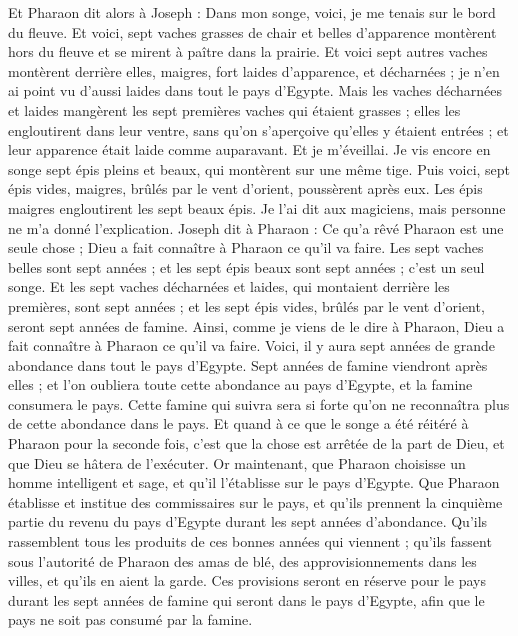 \begin{multicols}{2}
Et Pharaon dit alors à Joseph : Dans mon songe, voici, je me tenais sur le bord du fleuve.
Et voici, sept vaches grasses de chair et belles d'apparence montèrent hors du fleuve et se mirent à paître dans la prairie.
Et voici sept autres vaches montèrent derrière elles, maigres, fort laides d'apparence, et décharnées ; je n'en ai point vu d'aussi laides dans tout le pays d'Egypte.
Mais les vaches décharnées et laides mangèrent les sept premières vaches qui étaient grasses ;
elles les engloutirent dans leur ventre, sans qu'on s'aperçoive qu'elles y étaient entrées ; et leur apparence était laide comme auparavant. Et je m'éveillai.
Je vis encore en songe sept épis pleins et beaux, qui montèrent sur une même tige.
Puis voici, sept épis vides, maigres, brûlés par le vent d'orient, poussèrent après eux.
Les épis maigres engloutirent les sept beaux épis. Je l'ai dit aux magiciens, mais personne ne m'a donné l'explication. 
Joseph dit à Pharaon : Ce qu'a rêvé Pharaon est une seule chose ; Dieu a fait connaître à Pharaon ce qu'il va faire.
Les sept vaches belles sont sept années ; et les sept épis beaux sont sept années ; c'est un seul songe.
Et les sept vaches décharnées et laides, qui montaient derrière les premières, sont sept années ; et les sept épis vides, brûlés par le vent d'orient, seront sept années de famine.
Ainsi, comme je viens de le dire à Pharaon, Dieu a fait connaître à Pharaon ce qu'il va faire.
Voici, il y aura sept années de grande abondance dans tout le pays d'Egypte.
Sept années de famine viendront après elles ; et l'on oubliera toute cette abondance au pays d'Egypte, et la famine consumera le pays.
Cette famine qui suivra sera si forte qu'on ne reconnaîtra plus de cette abondance dans le pays.
Et quand à ce que le songe a été réitéré à Pharaon  pour la seconde fois, c'est que la chose est arrêtée de la part de Dieu, et que Dieu se hâtera de l'exécuter.
Or maintenant, que Pharaon choisisse un homme intelligent et sage, et qu'il l'établisse sur le pays d'Egypte.
Que Pharaon établisse et institue des commissaires sur le pays, et qu'ils prennent la cinquième partie du revenu du pays d'Egypte durant les sept années d'abondance.
Qu'ils rassemblent tous les produits de ces bonnes années qui viennent ; qu'ils fassent sous l'autorité de Pharaon des amas de blé, des approvisionnements dans les villes, et qu'ils en aient la garde.
Ces provisions seront en réserve pour le pays durant les sept années de famine qui seront dans le pays d'Egypte, afin que le pays ne soit pas consumé par la famine.

\end{multicols}
